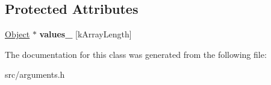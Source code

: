 \subsection*{Protected Attributes}
\begin{DoxyCompactItemize}
\item 
\hypertarget{classv8_1_1internal_1_1_custom_arguments_base_a1a42a0ba080930803cec7eb99ab30b9f}{}\hyperlink{classv8_1_1internal_1_1_object}{Object} $\ast$ {\bfseries values\+\_\+} \mbox{[}k\+Array\+Length\mbox{]}\label{classv8_1_1internal_1_1_custom_arguments_base_a1a42a0ba080930803cec7eb99ab30b9f}

\end{DoxyCompactItemize}


The documentation for this class was generated from the following file\+:\begin{DoxyCompactItemize}
\item 
src/arguments.\+h\end{DoxyCompactItemize}
